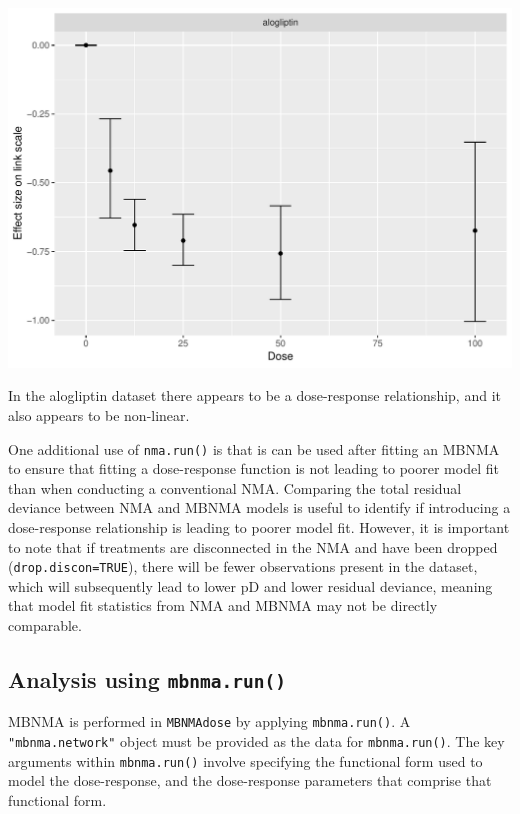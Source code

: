 \documentclass[]{article}
\begin{document}
\includegraphics{mbnmadose_files/figure-latex/unnamed-chunk-13-1.pdf}

In the alogliptin dataset there appears to be a dose-response
relationship, and it also appears to be non-linear.

One additional use of \texttt{nma.run()} is that is can be used after
fitting an MBNMA to ensure that fitting a dose-response function is not
leading to poorer model fit than when conducting a conventional NMA.
Comparing the total residual deviance between NMA and MBNMA models is
useful to identify if introducing a dose-response relationship is
leading to poorer model fit. However, it is important to note that if
treatments are disconnected in the NMA and have been dropped
(\texttt{drop.discon=TRUE}), there will be fewer observations present in
the dataset, which will subsequently lead to lower pD and lower residual
deviance, meaning that model fit statistics from NMA and MBNMA may not
be directly comparable.

\hypertarget{analysis-using-mbnma.run}{%
\subsection{\texorpdfstring{Analysis using
\texttt{mbnma.run()}}{Analysis using mbnma.run()}}\label{analysis-using-mbnma.run}}

MBNMA is performed in \texttt{MBNMAdose} by applying
\texttt{mbnma.run()}. A \texttt{"mbnma.network"} object must be provided
as the data for \texttt{mbnma.run()}. The key arguments within
\texttt{mbnma.run()} involve specifying the functional form used to
model the dose-response, and the dose-response parameters that comprise
that functional form.
\end{document}
